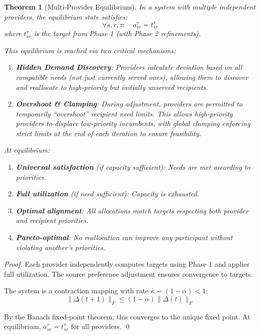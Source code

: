 \documentclass[11pt]{article}
\newtheorem{theorem}{Theorem}
\begin{document}
\begin{theorem}[Multi-Provider Equilibrium]
\label{thm:multi-provider-equilibrium}
In a system with multiple independent providers, the equilibrium state satisfies:
\[
\forall s,r,\tau: \quad a_{sr}^\tau = t_{sr}^\tau
\]
where $t_{sr}^\tau$ is the target from Phase 1 (with Phase 2 refinements).

This equilibrium is reached via two critical mechanisms:
\begin{enumerate}
    \item \textbf{Hidden Demand Discovery}: Providers calculate deviation based on \emph{all} compatible needs (not just currently served ones), allowing them to discover and reallocate to high-priority but initially unserved recipients.
    \item \textbf{Overshoot \& Clamping}: During adjustment, providers are permitted to temporarily ``overshoot'' recipient need limits. This allows high-priority providers to displace low-priority incumbents, with global clamping enforcing strict limits at the end of each iteration to ensure feasibility.
\end{enumerate}

At equilibrium:
\begin{enumerate}
\item \textbf{Universal satisfaction} (if capacity sufficient): Needs are met according to priorities.
\item \textbf{Full utilization} (if need sufficient): Capacity is exhausted.
\item \textbf{Optimal alignment}: All allocations match targets respecting both provider and recipient priorities.
\item \textbf{Pareto-optimal}: No reallocation can improve any participant without violating another's priorities.
\end{enumerate}
\end{theorem}

\begin{proof}
Each provider independently computes targets using Phase 1 and applies full utilization. The source preference adjustment ensures convergence to targets.

The system is a contraction mapping with rate $\kappa = (1-\alpha) < 1$:
\[
\|\Delta(t+1)\|_F \leq (1-\alpha) \|\Delta(t)\|_F
\]

By the Banach fixed-point theorem, this converges to the unique fixed point. At equilibrium, $a_{sr}^\tau = t_{sr}^\tau$ for all providers.
\qed
\end{proof}
\end{document}
